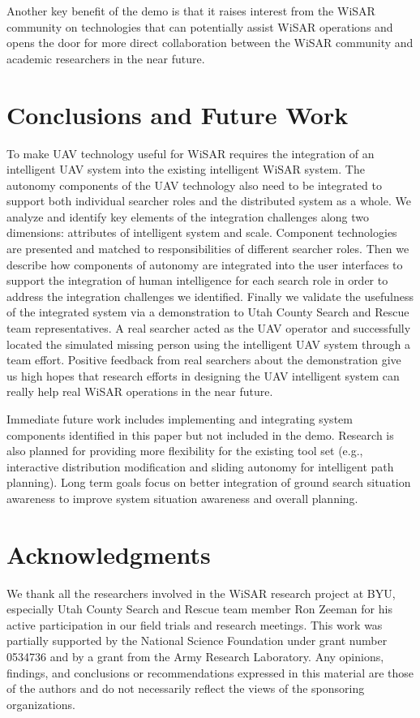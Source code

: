 \documentclass[letterpaper]{article}
\begin{document}
Another key benefit of the demo is that it raises interest from the WiSAR community on technologies that can potentially assist WiSAR operations and opens the door for more direct collaboration between the WiSAR community and academic researchers in the near future.

\section{Conclusions and Future Work}

To make UAV technology useful for WiSAR requires the integration of an intelligent UAV system into the existing intelligent WiSAR system. The autonomy components of the UAV technology also need to be integrated to support both individual searcher roles and the distributed system as a whole. We analyze and identify key elements of the integration challenges along two dimensions: attributes of intelligent system and scale. Component technologies are presented and matched to responsibilities of different searcher roles. Then we describe how components of autonomy are integrated into the user interfaces to support the integration of human intelligence for each search role in order to address the integration challenges we identified. Finally we validate the usefulness of the integrated system via a demonstration to Utah County Search and Rescue team representatives. A real searcher acted as the UAV operator and successfully located the simulated missing person using the intelligent UAV system through a team effort. Positive feedback from real searchers about the demonstration give us high hopes that research efforts in designing the UAV intelligent system can really help real WiSAR operations in the near future.

Immediate future work includes implementing and integrating system components identified in this paper but not included in the demo. Research is also planned for providing more flexibility for the existing tool set (e.g., interactive distribution modification and sliding autonomy for intelligent path planning). Long term goals focus on better integration of ground search situation awareness to improve system situation awareness and overall planning.




\section{Acknowledgments}
We thank all the researchers involved in the WiSAR research project at BYU, especially Utah County Search and Rescue team member Ron Zeeman for his active participation in our field trials and research meetings. This work was partially supported by the National Science Foundation under grant number 0534736 and by a grant from the Army Research Laboratory.  Any opinions, findings, and conclusions or recommendations expressed in this material are those of the authors and do not necessarily reflect the views of the sponsoring organizations.

\footnotesize


\end{document}
